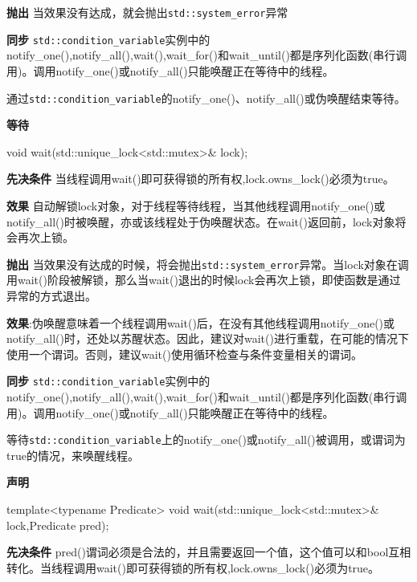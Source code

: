 \textbf{抛出}
当效果没有达成，就会抛出\texttt{std::system\_error}异常

\textbf{同步}
\texttt{std::condition\_variable}实例中的notify\_one(),notify\_all(),wait(),wait\_for()和wait\_until()都是序列化函数(串行调用)。调用notify\_one()或notify\_all()只能唤醒正在等待中的线程。


通过\texttt{std::condition\_variable}的notify\_one()、notify\_all()或伪唤醒结束等待。

\textbf{等待}

\begin{cpp}
void wait(std::unique_lock<std::mutex>& lock);
\end{cpp}

\textbf{先决条件}
当线程调用wait()即可获得锁的所有权,lock.owns\_lock()必须为true。

\textbf{效果}
自动解锁lock对象，对于线程等待线程，当其他线程调用notify\_one()或notify\_all()时被唤醒，亦或该线程处于伪唤醒状态。在wait()返回前，lock对象将会再次上锁。

\textbf{抛出}
当效果没有达成的时候，将会抛出\texttt{std::system\_error}异常。当lock对象在调用wait()阶段被解锁，那么当wait()退出的时候lock会再次上锁，即使函数是通过异常的方式退出。

\textbf{效果}:伪唤醒意味着一个线程调用wait()后，在没有其他线程调用notify\_one()或notify\_all()时，还处以苏醒状态。因此，建议对wait()进行重载，在可能的情况下使用一个谓词。否则，建议wait()使用循环检查与条件变量相关的谓词。

\textbf{同步}
\texttt{std::condition\_variable}实例中的notify\_one(),notify\_all(),wait(),wait\_for()和wait\_until()都是序列化函数(串行调用)。调用notify\_one()或notify\_all()只能唤醒正在等待中的线程。


等待\texttt{std::condition\_variable}上的notify\_one()或notify\_all()被调用，或谓词为true的情况，来唤醒线程。

\textbf{声明}

\begin{cpp}
template<typename Predicate>
void wait(std::unique_lock<std::mutex>& lock,Predicate pred);
\end{cpp}

\textbf{先决条件}
pred()谓词必须是合法的，并且需要返回一个值，这个值可以和bool互相转化。当线程调用wait()即可获得锁的所有权,lock.owns\_lock()必须为true。

